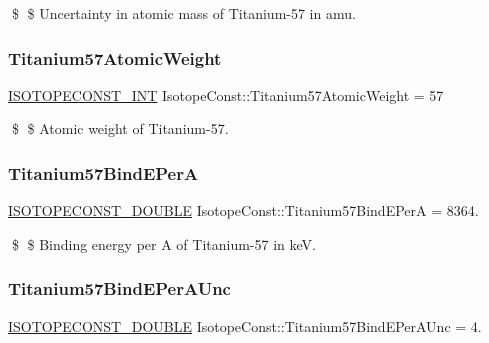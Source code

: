 \$ \$ Uncertainty in atomic mass of Titanium-\/57 in amu. \mbox{\label{group___isotope_const-_titanium-_ti57_gaa0f96137950ffc844027d1ee69fc7506}} 
\subsubsection{\texorpdfstring{Titanium57\+Atomic\+Weight}{Titanium57AtomicWeight}}
{\footnotesize\ttfamily \mbox{\hyperlink{group___isotope_const-_macros_ga5f18360b3e99483a35c32d789e62621c}{I\+S\+O\+T\+O\+P\+E\+C\+O\+N\+S\+T\+\_\+\+I\+NT}} Isotope\+Const\+::\+Titanium57\+Atomic\+Weight = 57}

\$ \$ Atomic weight of Titanium-\/57. \mbox{\label{group___isotope_const-_titanium-_ti57_ga58486134addaf44a120d1ac8082371b7}} 
\subsubsection{\texorpdfstring{Titanium57\+Bind\+E\+PerA}{Titanium57BindEPerA}}
{\footnotesize\ttfamily \mbox{\hyperlink{group___isotope_const-_macros_ga8f45a7272ce02c0b4c65c44636ed719a}{I\+S\+O\+T\+O\+P\+E\+C\+O\+N\+S\+T\+\_\+\+D\+O\+U\+B\+LE}} Isotope\+Const\+::\+Titanium57\+Bind\+E\+PerA = 8364.}

\$ \$ Binding energy per A of Titanium-\/57 in keV. \mbox{\label{group___isotope_const-_titanium-_ti57_gad11b4bb5ef46a29b66d3c9832ed25377}} 
\subsubsection{\texorpdfstring{Titanium57\+Bind\+E\+Per\+A\+Unc}{Titanium57BindEPerAUnc}}
{\footnotesize\ttfamily \mbox{\hyperlink{group___isotope_const-_macros_ga8f45a7272ce02c0b4c65c44636ed719a}{I\+S\+O\+T\+O\+P\+E\+C\+O\+N\+S\+T\+\_\+\+D\+O\+U\+B\+LE}} Isotope\+Const\+::\+Titanium57\+Bind\+E\+Per\+A\+Unc = 4.}


